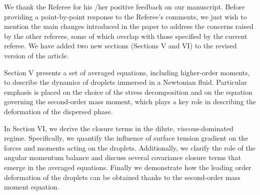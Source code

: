 \documentclass[10pt,a4paper]{article}
\newcommand{\tb}[1]{\color{blue}#1\color{black}}
\begin{document}
\tb{We thank the Referee for his /her positive feedback on our manuscript.
Before providing a point-by-point response to the Referee’s comments, we just wish to mention the main changes introduced in the paper to address the concerns raised by the other referees, some of which overlap with
those specified by the current referee.
We have added two new sections (Sections V and VI) to the revised version of the article.

Section V presents a set of averaged equations, including higher-order moments, to describe the dynamics of droplets immersed in a Newtonian fluid. 
Particular emphasis is placed on the choice of the stress decomposition and on the equation governing the second-order mass moment, which plays a key role in describing the deformation of the dispersed phase.

In Section VI, we derive the closure terms in the dilute, viscous-dominated regime. 
Specifically, we quantify the influence of surface tension gradient on the forces and moments acting on the droplets. 
Additionally, we clarify the role of the angular momentum balance and discuss several covariance closure terms that emerge in the averaged equations.
Finally we demonstrate how the leading order deformation of the droplets can be obtained thanks to the second-order mass moment equation.


}
\end{document}
